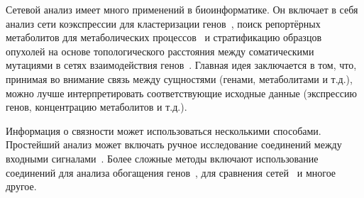 \startprefacepage

Сетевой анализ имеет много применений в биоинформатике. Он включает в себя анализ
сети коэкспрессии для кластеризации генов~\cite{Langfelder2008}, поиск
репортёрных метаболитов для метаболических процессов~\cite{Patil2005} и
стратификацию образцов опухолей на основе топологического расстояния между
соматическими мутациями в сетях взаимодействия генов~\cite{Hofree2013}. Главная
идея заключается в том, что, принимая во внимание связь между сущностями
(генами, метаболитами и т.д.), можно лучше интерпретировать соответствующие
исходные данные (экспрессию генов, концентрацию метаболитов и т.д.).


Информация о связности может использоваться несколькими способами. Простейший
анализ может включать ручное исследование соединений между входными
сигналами~\cite{Karnovsky2012}. Более сложные методы включают использование
соединений для анализа обогащения генов~\cite{Alexeyenko2012}, для
сравнения сетей~\cite{Ideker2012} и многое другое.

